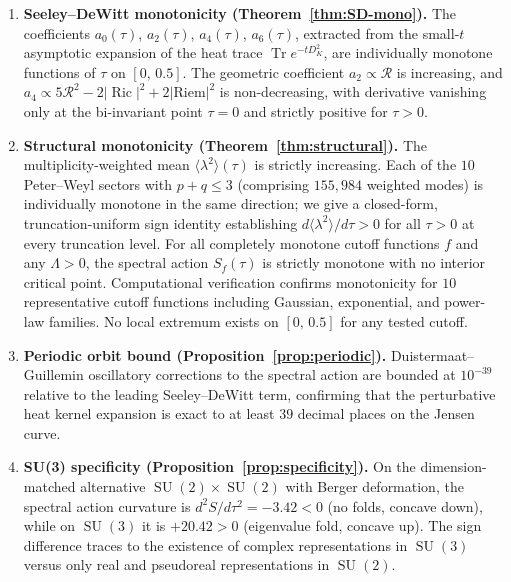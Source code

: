 \documentclass[12pt]{article}
\theoremstyle{definition}
\theoremstyle{remark}
\DeclareMathOperator{\Tr}{Tr}
\DeclareMathOperator{\Ric}{Ric}
\DeclareMathOperator{\SU}{SU}
\begin{document}
\begin{enumerate}
\item \textbf{Seeley--DeWitt monotonicity (Theorem~\ref{thm:SD-mono}).}
  The coefficients $a_0(\tau)$, $a_2(\tau)$, $a_4(\tau)$, $a_6(\tau)$,
  extracted from the small-$t$ asymptotic expansion of the heat trace
  $\Tr e^{-tD_K^2}$, are individually monotone functions of $\tau$ on
  $[0,\, 0.5]$.  The geometric coefficient $a_2 \propto \mathcal{R}$
  is increasing, and $a_4 \propto 5\mathcal{R}^2 - 2|\Ric|^2 +
  2|\mathrm{Riem}|^2$ is non-decreasing, with derivative vanishing
  only at the bi-invariant point $\tau=0$ and strictly positive for
  $\tau>0$.

\item \textbf{Structural monotonicity (Theorem~\ref{thm:structural}).}
  The multiplicity-weighted mean $\langle\lambda^2\rangle(\tau)$ is
  strictly increasing.  Each of the $10$ Peter--Weyl sectors with
  $p+q \leq 3$ (comprising $155{,}984$ weighted modes) is
  individually monotone in the same direction; we give a closed-form,
  truncation-uniform sign identity establishing
  $d\langle\lambda^2\rangle/d\tau > 0$ for all $\tau>0$ at every
  truncation level.  For all completely monotone cutoff functions $f$
  and any $\Lambda > 0$, the spectral action $S_f(\tau)$ is strictly
  monotone with no interior critical point.  Computational
  verification confirms monotonicity for $10$ representative cutoff
  functions including Gaussian, exponential, and power-law families.
  No local extremum exists on $[0,\,0.5]$ for any tested cutoff.

\item \textbf{Periodic orbit bound (Proposition~\ref{prop:periodic}).}
  Duistermaat--Guillemin oscillatory corrections to the spectral
  action are bounded at $10^{-39}$ relative to the leading
  Seeley--DeWitt term, confirming that the perturbative heat kernel
  expansion is exact to at least $39$ decimal places on the Jensen
  curve.

\item \textbf{SU(3) specificity
  (Proposition~\ref{prop:specificity}).}  On the
  dimension-matched alternative $\SU(2)\times\SU(2)$ with Berger
  deformation, the spectral action curvature is $d^2S/d\tau^2 =
  -3.42 < 0$ (no folds, concave down), while on $\SU(3)$ it is
  $+20.42 > 0$ (eigenvalue fold, concave up).  The sign difference
  traces to the existence of complex representations in $\SU(3)$
  versus only real and pseudoreal representations in $\SU(2)$.
\end{enumerate}
\end{document}
